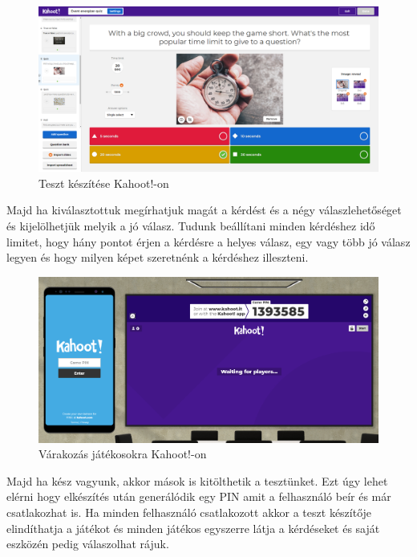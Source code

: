 \begin{figure}[h]
  \centering
  \includegraphics[width=\linewidth]{images/kahoot_test_making.PNG}
  \caption{Teszt készítése Kahoot!-on}
\end{figure}

Majd ha kiválasztottuk megírhatjuk magát a kérdést és a négy válaszlehetőséget és kijelölhetjük melyik a jó válasz. Tudunk beállítani minden kérdéshez idő limitet, hogy hány pontot érjen a kérdésre a helyes válasz, egy vagy több jó válasz legyen és hogy milyen képet szeretnénk a kérdéshez illeszteni.


\begin{figure}[h]
  \centering
  \includegraphics[width=\textwidth]{images/kahoot_play.png}
  \caption{Várakozás játékosokra Kahoot!-on}
\end{figure}
Majd ha kész vagyunk, akkor mások is kitölthetik a tesztünket. Ezt úgy lehet elérni hogy elkészítés után generálódik egy PIN amit a felhasználó beír és már csatlakozhat is. Ha minden felhasználó csatlakozott akkor a teszt készítője elindíthatja a játékot és minden játékos egyszerre látja a kérdéseket és saját eszközén pedig válaszolhat rájuk.


